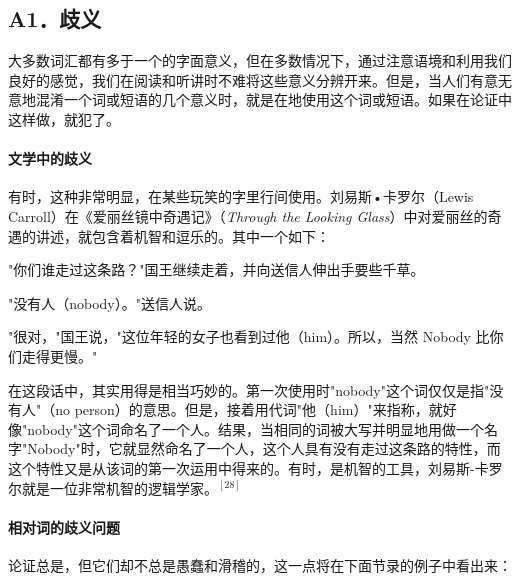 \subsection{A1．歧义}

\begin{theorembox}[title=歧义谬误的定义]
大多数词汇都有多于一个的字面意义，但在多数情况下，通过注意语境和利用我们良好的感觉，我们在阅读和听讲时不难将这些意义分辨开来。但是，当人们有意无意地混淆一个词或短语的几个意义时，就是在地使用这个词或短语。如果在论证中这样做，就犯了。
\end{theorembox}

\paragraph{文学中的歧义}
\begin{examplebox}[title=文学中的歧义]
有时，这种非常明显，在某些玩笑的字里行间使用。刘易斯•卡罗尔（Lewis Carroll）在《爱丽丝镜中奇遇记》（\textit{Through the Looking Glass}）中对爱丽丝的奇遇的讲述，就包含着机智和逗乐的。其中一个如下：

"你们谁走过这条路？"国王继续走着，并向送信人伸出手要些千草。

"没有人（nobody）。"送信人说。

"很对，"国王说，"这位年轻的女子也看到过他（him）。所以，当然 Nobody 比你们走得更慢。"

在这段话中，其实用得是相当巧妙的。第一次使用时"nobody"这个词仅仅是指"没有人"（no person）的意思。但是，接着用代词"他（him）"来指称，就好像"nobody"这个词命名了一个人。结果，当相同的词被大写并明显地用做一个名字"Nobody"时，它就显然命名了一个人，这个人具有没有走过这条路的特性，而这个特性又是从该词的第一次运用中得来的。有时，是机智的工具，刘易斯-卡罗尔就是一位非常机智的逻辑学家。${ }^{[28]}$
\end{examplebox}

\paragraph{相对词的歧义问题}
论证总是，但它们却不总是愚蠢和滑稽的，这一点将在下面节录的例子中看出来：

